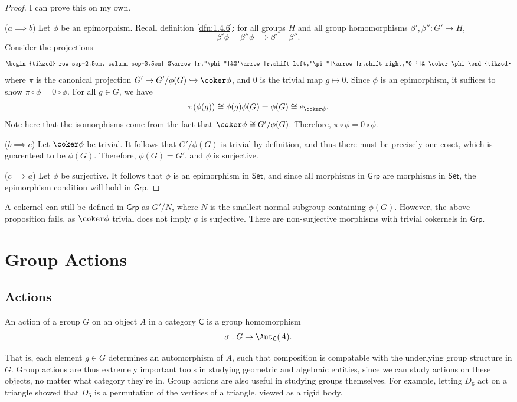 \begin{proof}
	I can prove this on my own.

	($a\implies b$) Let $\phi $ be an epimorphism. Recall definition \ref{dfn:1.4.6}: for all groups $H$ and all group homomorphisms $\beta',\beta'' : G' \to H$,
	\[
		\beta' \phi =\beta '' \phi \implies \beta '=\beta ''
	.\]
	Consider the projections
	\[\begin{tikzcd}[row sep=2.5em, column sep=3.5em]
		G\arrow[r,"\phi "]&G'\arrow[r,shift left,"\pi"]\arrow[r,shift right,"0"']& \coker \phi 
	\end{tikzcd}\]
	where $\pi $ is the canonical projection $G' \to G' /\phi(G) \hookrightarrow \coker \phi $, and $0$ is the trivial map $g\mapsto 0$. Since $\phi $ is an epimorphism, it suffices to show $\pi \circ \phi =0\circ \phi $. For all $g\in G$, we have
	\[
		\pi (\phi (g))\cong \phi (g)\phi (G)=\phi (G)\cong e_{\coker \phi }
	.\]
	Note here that the isomorphisms come from the fact that $\coker \phi \cong G' /\phi (G)$. Therefore, $\pi \circ \phi =0\circ \phi $.

	($b\implies c$) Let $\coker \phi $ be trivial. It follows that $G' /\phi (G)$ is trivial by definition, and thus there must be precisely one coset, which is guarenteed to be $\phi (G)$. Therefore, $\phi (G)=G'$, and $\phi $ is surjective.

	($c \implies a$) Let $\phi $ be surjective. It follows that $\phi $ is an epimorphism in $\mathsf{Set}$, and since all morphisms in $\mathsf{Grp}$ are morphisms in $\mathsf{Set}$, the epimorphism condition will hold in $\mathsf{Grp}$.
\end{proof}

A cokernel can still be defined in $\mathsf{Grp}$ as $G' / N$, where $N$ is the smallest normal subgroup containing $\phi (G)$. However, the above proposition fails, as $\coker \phi $ trivial does not imply $\phi $ is surjective. There are non-surjective morphisms with trivial cokernels in $\mathsf{Grp}$.

\section{Group Actions}
\subsection{Actions}
\begin{definition}\label{dfn:2.9.1}
	An action of a group $G$ on an object $A$ in a category $\mathsf{C}$ is a group homomorphism
	\[
		\sigma : G \to \Aut_{\mathsf{C}}( A ) 
	.\]
\end{definition}
That is, each element $g\in G$ determines an automorphism of $A$, such that composition is compatable with the underlying group structure in $G$. Group actions are thus extremely important tools in studying geometric and algebraic entities, since we can study actions on these objects, no matter what category they're in. Group actions are also useful in studying groups themselves. For example, letting $D_6$ act on a triangle showed that $D_6$ is a permutation of the vertices of a triangle, viewed as a rigid body.

